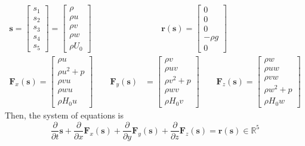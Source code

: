 \documentclass[12pt, openany]{report}
\newcommand{\R}{\mathbb{R}}
\theoremstyle{definition}
\begin{document}
\begin{equation}
	\begin{aligned}
		\boldsymbol{s} = \begin{bmatrix}
			s_1\\s_2\\s_3\\s_4\\s_5
		\end{bmatrix} = \begin{bmatrix}
			\rho \\ \rho u\\ \rho v\\ \rho w \\\rho U_0
		\end{bmatrix} &\qquad \boldsymbol{r}(\boldsymbol{s}) =\begin{bmatrix}
		0 \\0\\0\\-\rho g\\0
		\end{bmatrix} \\ 
		\boldsymbol{F}_x(\boldsymbol{s}) = \begin{bmatrix}
			\rho u \\ \rho u^2 + p \\ \rho vu \\ \rho w u \\ \rho H_0 u
		\end{bmatrix} \qquad \boldsymbol{F}_y(\boldsymbol{s}) &= \begin{bmatrix}
			\rho v \\ \rho uv \\ \rho v^2 + p \\ \rho wv \\ \rho H_0 v
		\end{bmatrix} \qquad \boldsymbol{F}_z(\boldsymbol{s}) = \begin{bmatrix}
			\rho w \\ \rho uw\\ \rho vw \\ \rho w^2 + p \\ \rho H_0 w
		\end{bmatrix}
	\end{aligned}
\end{equation}
Then, the system of equations is 
\begin{equation}
	\frac{\partial }{\partial t}\boldsymbol{s} + \frac{\partial }{\partial x} \boldsymbol{F}_x(\boldsymbol{s}) + \frac{\partial }{\partial y} \boldsymbol{F}_y(\boldsymbol{s}) + \frac{\partial }{\partial z} \boldsymbol{F}_z(\boldsymbol{s}) = \boldsymbol{r}(\boldsymbol{s}) \in \R^5
\end{equation}
\end{document}
